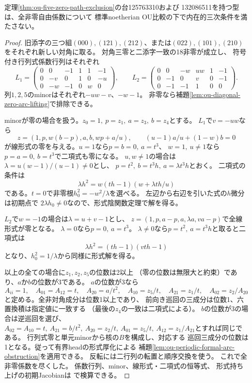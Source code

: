 \begin{theorem}[125763310と132086511の内在的排除]
\label{thm:ou-five-zero-periodic-exclusion}
定理\ref{thm:ou-five-zero-path-exclusion}の台125763310および
132086511を持つ型は、全非零自由係数について
標準noetherian OU比較の下で内在的三次条件を満たさない。
\end{theorem}
\begin{proof}
旧添字の三つ組$(000),(121),(212)$、または$(022),(101),(210)$
をそれぞれ新しい対角に取る。
対角三零と二添字一致の18非零が成立し、
符号付き行列式係数行列はそれぞれ
\[
 L_1=\begin{pmatrix}
0&0&-1&1&1&-1\\
0&-v&0&1&0&-u\\
0&-w&-1&0&w&0
\end{pmatrix},\qquad
 L_2=\begin{pmatrix}
0&0&-w&uw&1&-1\\
0&-1&0&v&0&-1\\
0&-1&-1&1&0&0
\end{pmatrix}.
\]
列$1,2,5$のminorはそれぞれ$-uw-v$、$-w-1$。
非零なら補題\ref{lem:ou-diagonal-zero-arc-lifting}で排除できる。

minorが零の場合を扱う。$z_0=1,\ p=z_1,\ a=z_3,\ b=z_4$とする。
$L_1$で$v=-uw$なら
\[
 z=(1,p,w(b-p),a,b,wp+a/u),\qquad
 (u-1)a/u+(1-w)b=0
\]
が線形式の零を与える。$u=1$なら$p=b=0,\ a=t^3$、
$w=1,\ u\ne1$なら$p=a=0,\ b=t^3$で二項式も零になる。
$u,w\ne1$の場合は$\lambda=u(w-1)/(u-1)\ne0$とし、
$p=t^2,\ b=t^3h,\ a=\lambda t^3h$とおく。
二項式の条件は
\[
 \lambda h^2=w(th-1)(w+\lambda th/u)
\]
である。$t=0$で非零根$h_0^2=-w^2/\lambda$を選べる。
左辺から右辺を引いた式の$h$微分は初期点で
$2\lambda h_0\ne0$なので、形式陰関数定理で解を得る。

$L_2$で$w=-1$の場合は$\lambda=u+v-1$とし、
$z=(1,p,a-p,a,\lambda a,va-p)$で全線形式が零となる。
$\lambda=0$なら$p=0,\ a=t^3$。
$\lambda\ne0$なら$p=t^2,\ a=t^3h$と取ると二項式は
\[
 \lambda h^2=(th-1)(vth-1)
\]
となり、$h_0^2=1/\lambda$から同様に形式解を得る。

以上の全ての場合に$z_1,z_2,z_5$の位数は2以上
（零の位数は無限大と約束）であり、$a$か$b$の位数が3である。
$a$の位数が3なら
\[
 A_{ii}=1,\quad A_{01}=A_{12}=t,\quad A_{20}=a/t^2,\quad
 A_{10}=z_5/t,\quad A_{21}=z_1/t,\quad A_{02}=z_2/A_{20}
\]
と定める。全非対角成分は位数1以上であり、
前向き巡回の三成分は位数1、六置換積は指定値に一致する
（最後の$z_4$の一致は二項式による）。
$b$の位数が3の場合は逆巡回を選び、
$A_{02}=A_{10}=t,\ A_{21}=b/t^2,\ A_{20}=z_2/t,\
 A_{01}=z_5/t,\ A_{12}=z_1/A_{21}$とすれば同じである。
行列式零と単元minorから核の$B$を構成し、対応する
巡回三成分の位数は1となる。従って有界headの形式厚化による
補題\ref{lem:ou-periodic-formal-arc-obstruction}を適用できる。
反転には二行列の転置と順序交換を使う。
これで全非零係数を尽くした。
係数行列、minor、線形式・二項式の恒等式、
形式持ち上げの初期Jacobianは
で検算できる。
\end{proof}

